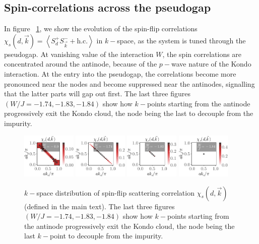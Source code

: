 \documentclass[reprint,hidelinks]{revtex4-2}
\begin{document}
\subsection{Spin-correlations across the pseudogap}
In figure ~\ref{spinCorr}, we show the evolution of the spin-flip correlations \(\chi_s(d,\vec k) = \left<S_d^+ S_{\vec k}^- + \text{h.c.}\right>\) in \(k-\)space, as the system is tuned through the pseudogap. At vanishing value of the interaction \(W\), the spin correlations are concentrated around the antinode, because of the \(p-\)wave nature of the Kondo interaction. At the entry into the pseudogap, the correlations become more pronounced near the nodes and become suppressed near the antinodes, signalling that the latter parts will gap out first. The last three figures \((W/J=-1.74, -1.83, -1.84)\) show how \(k-\)points starting from the antinode progressively exit the Kondo cloud, the node being the last to decouple from the impurity.

\begin{figure}[htpb]
	\centering
	\includegraphics[width=0.23\textwidth]{SF-1.pdf}
	\includegraphics[width=0.23\textwidth]{SF-3.pdf}
	\includegraphics[width=0.23\textwidth]{SF-5.pdf}
	\includegraphics[width=0.23\textwidth]{SF-6.pdf}
	\caption{\(k-\)space distribution of spin-flip scattering correlation \(\chi_s(d,\vec k)\) (defined in the main text). The last three figures \((W/J=-1.74, -1.83, -1.84)\) show how \(k-\)points starting from the antinode progressively exit the Kondo cloud, the node being the last \(k-\)point to decouple from the impurity.}
	\label{spinCorr}
\end{figure}
\end{document}
